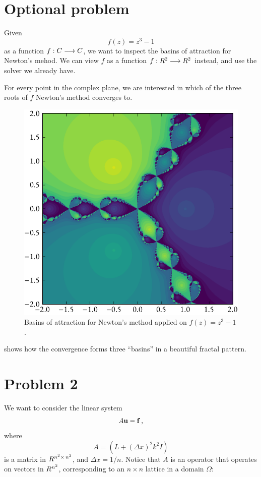 \documentclass[12pt]{article}
\begin{document}
\begin{multicols*}{2}
    \section*{Optional problem}
    Given
    \[
        f(z) = z^3 - 1
    \]
    as a function $f: \C \longrightarrow \C$, we want to inspect the basins
    of attraction for Newton's mehod.
    We can view $f$ as a function $f: \R^2 \longrightarrow \R^2$ instead,
    and use the solver we already have.

    For every point in the complex plane, we are interested in which
    of the three roots of $f$ Newton's method converges to.
    \begin{figure}[H]
        \centering
        \includegraphics[width=0.75\columnwidth]{lores.pdf}
        \caption{
            Basins of attraction for Newton's method applied on
            $f(z) = z^3 - 1$.
        }
        \label{fig:basins}
    \end{figure}\noindent
     shows how the convergence forms three ``basins'' in
    a beautiful fractal pattern.


    \section*{Problem 2}
    We want to consider the linear system
    \[
        A \vec u = \vec f \,\text,
    \]
    where
    \[
        A = \left(
            L + (\Delta x)^2 k^2 I
        \right)
    \]
    is a matrix in $\R^{{n^2} \times\, {n^2}}$,
    and $\Delta x = 1/n$. Notice that $A$ is an operator
    that operates on vectors in $\R^{n^2}$, corresponding to
    an $n \times n$ lattice in a domain $\Omega$:


\end{multicols*}
\end{document}
